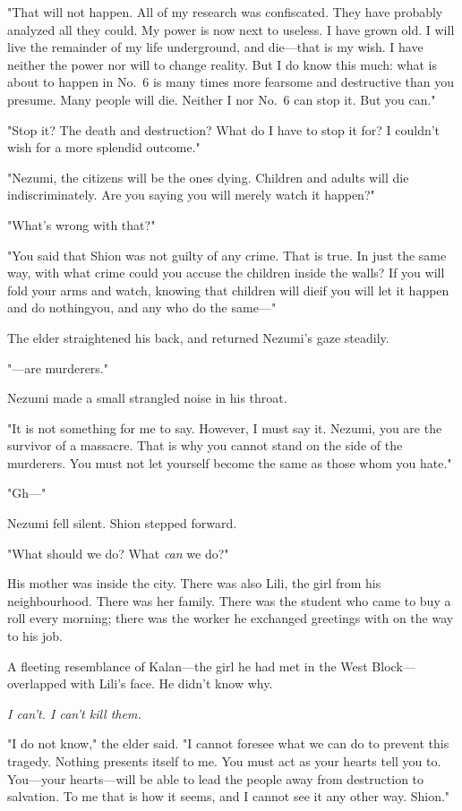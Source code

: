 "That will not happen. All of my research was confiscated. They have
probably analyzed all they could. My power is now next to useless. I
have grown old. I will live the remainder of my life underground, and
die---that is my wish. I have neither the power nor will to change
reality. But I do know this much: what is about to happen in No.~6 is
many times more fearsome and destructive than you presume. Many people
will die. Neither I nor No.~6 can stop it. But you can."

"Stop it? The death and destruction? What do I have to stop it for? I
couldn't wish for a more splendid outcome."

"Nezumi, the citizens will be the ones dying. Children and adults will
die indiscriminately. Are you saying you will merely watch it happen?"

"What's wrong with that?"

"You said that Shion was not guilty of any crime. That is true. In just
the same way, with what crime could you accuse the children inside the
walls? If you will fold your arms and watch, knowing that children will
die\el if you will let it happen and do nothing\el you, and any who do
the same---"

The elder straightened his back, and returned Nezumi's gaze steadily.

"---are murderers."

Nezumi made a small strangled noise in his throat.

"It is not something for me to say. However, I must say it. Nezumi, you
are the survivor of a massacre. That is why you cannot stand on the side
of the murderers. You must not let yourself become the same as those
whom you hate."

"Gh---"

Nezumi fell silent. Shion stepped forward.

"What should we do? What \emph{can} we do?"

His mother was inside the city. There was also Lili, the girl from his
neighbourhood. There was her family. There was the student who came to
buy a roll every morning; there was the worker he exchanged greetings
with on the way to his job.

A fleeting resemblance of Kalan---the girl he had met in the West
Block---overlapped with Lili's face. He didn't know why.

\emph{I can't. I can't kill them.}

"I do not know," the elder said. "I cannot foresee what we can do to
prevent this tragedy. Nothing presents itself to me. You must act as
your hearts tell you to. You---your hearts---will be able to lead the people
away from destruction to salvation. To me that is how it seems, and I
cannot see it any other way. Shion."


